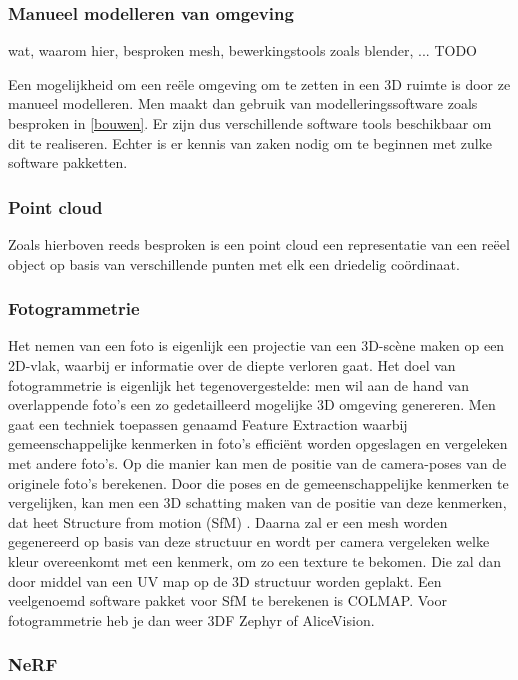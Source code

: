 \subsubsection{Manueel modelleren van omgeving}
wat, waarom hier, besproken mesh, bewerkingstools zoals blender, ... TODO

Een mogelijkheid om een reële omgeving om te zetten in een 3D ruimte is door ze manueel modelleren. Men maakt dan gebruik van modelleringssoftware zoals besproken in \ref{bouwen}. Er zijn dus verschillende software tools beschikbaar om dit te realiseren. Echter is er kennis van zaken nodig om te beginnen met zulke software pakketten.


\subsubsection{Point cloud }
Zoals hierboven reeds besproken is een point cloud een representatie van een reëel object op basis van verschillende punten met elk een driedelig coördinaat.


\subsubsection{Fotogrammetrie}

Het nemen van een foto is eigenlijk een projectie van een 3D-scène maken op een 2D-vlak, waarbij er informatie over de diepte verloren gaat. Het doel van fotogrammetrie is eigenlijk het tegenovergestelde: men wil aan de hand van overlappende foto’s een zo gedetailleerd mogelijke 3D omgeving genereren. \autocite{FormLabs}
Men gaat een techniek toepassen genaamd Feature Extraction waarbij gemeenschappelijke kenmerken in foto’s efficiënt worden opgeslagen en vergeleken met andere foto’s. Op die manier kan men de positie van de camera-poses van de originele foto’s berekenen. Door die poses en de gemeenschappelijke kenmerken te vergelijken, kan men een 3D schatting maken van de positie van deze kenmerken, dat heet Structure from motion (SfM) \autocite{Schonberger2016}. Daarna zal er een mesh worden gegenereerd op basis van deze structuur en wordt per camera vergeleken welke kleur overeenkomt met een kenmerk, om zo een texture te bekomen. Die zal dan door middel van een UV map op de 3D structuur worden geplakt. Een veelgenoemd software pakket voor SfM te berekenen is COLMAP. Voor fotogrammetrie heb je dan weer 3DF Zephyr of AliceVision.

\subsubsection{NeRF}

